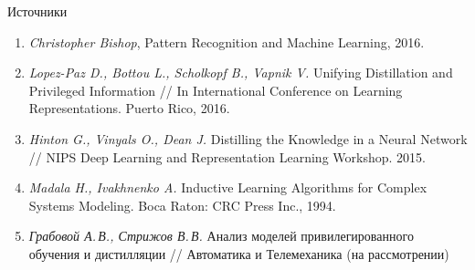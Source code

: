 \documentclass[9pt,pdf,hyperref={unicode}]{beamer}
\begin{document}
\begin{frame}{Источники}
\justifying
\begin{enumerate}
	\item \textit{Christopher Bishop}, Pattern Recognition and Machine Learning, 2016.
	\item \textit{Lopez-Paz D., Bottou L., Scholkopf B., Vapnik V.} Unifying Distillation and Privileged Information // In International Conference on Learning Representations. Puerto Rico, 2016.
	\item \textit{Hinton G., Vinyals O., Dean J.} Distilling the Knowledge in a Neural Network // NIPS Deep Learning and Representation Learning Workshop. 2015.
	\item \textit{Madala H., Ivakhnenko A.} Inductive Learning Algorithms for Complex Systems Modeling. Boca Raton: CRC Press Inc., 1994.
	\item \textit{Грабовой А.\,В., Стрижов В.\,В.} Анализ моделей привилегированного обучения и дистилляции // Автоматика и Телемеханика (на рассмотрении)
\end{enumerate}
\end{frame}
\end{document}
